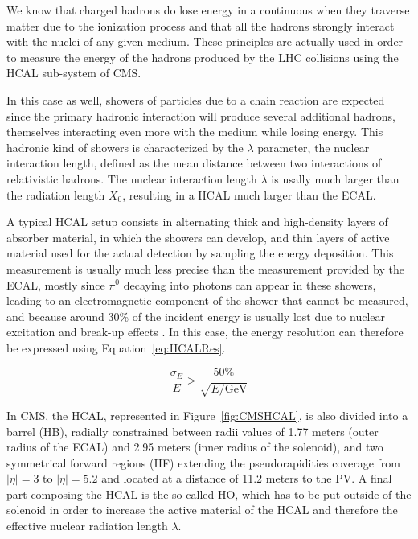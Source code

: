 \documentclass[a4paper, 10pt, openright]{report}
\begin{document}
We know that charged hadrons do lose energy in a continuous when they traverse matter due to the ionization process and that all the hadrons strongly interact with the nuclei of any given medium. These principles are actually used in order to measure the energy of the hadrons produced by the \ac{LHC} collisions using the \acf{HCAL} sub-system of \ac{CMS}. 

In this case as well, showers of particles due to a chain reaction are expected since the primary hadronic interaction will produce several additional hadrons, themselves interacting even more with the medium while losing energy. This hadronic kind of showers is characterized by the $\lambda$ parameter, the nuclear interaction length, defined as the mean distance between two interactions of relativistic hadrons. The nuclear interaction length $\lambda$ is usally much larger than the radiation length $X_0$, resulting in a \ac{HCAL} much larger than the \ac{ECAL}. 

A typical \ac{HCAL} setup consists in alternating thick and high-density layers of absorber material, in which the showers can develop, and thin layers of active material used for the actual detection by sampling the energy deposition. This measurement is usually much less precise than the measurement provided by the \ac{ECAL}, mostly since $\pi^0$ decaying into photons can appear in these showers, leading to an electromagnetic component of the shower that cannot be measured, and because around 30\% of the incident energy is usually lost due to nuclear excitation and break-up effects \cite{Thomson}. In this case, the energy resolution can therefore be expressed using Equation~\ref{eq:HCALRes}.

\begin{equation}
\label{eq:HCALRes}
\frac{\sigma_E}{E} > \frac{50\%}{\sqrt{E/\text{GeV}}}
\end{equation}

In \ac{CMS}, the \ac{HCAL}, represented in Figure~\ref{fig:CMSHCAL}, is also divided into a barrel (HB), radially constrained between radii values of 1.77 meters (outer radius of the \ac{ECAL}) and 2.95 meters (inner radius of the solenoid), and two symmetrical forward regions (HF) extending the pseudorapidities coverage from $|\eta| = 3$ to $|\eta| = 5.2$ and located at a distance of 11.2 meters to the \ac{PV}. A final part composing the \ac{HCAL} is the so-called \ac{HO}, which has to be put outside of the solenoid in order to increase the active material of the \ac{HCAL} and therefore the effective nuclear radiation length $\lambda$.
\end{document}
